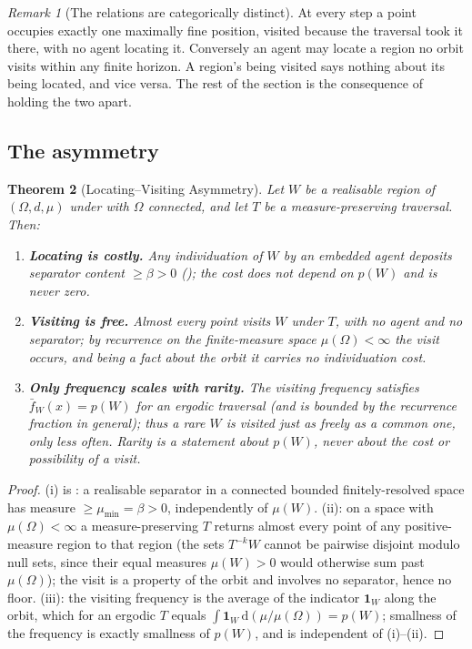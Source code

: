 \documentclass[11pt,a4paper]{article}
\theoremstyle{thmstyle}
\newtheorem{theorem}{Theorem}[section]
\theoremstyle{definition}
\theoremstyle{remark}
\newtheorem{remark}[theorem]{Remark}
\newcommand{\Space}{\Omega}
\newcommand{\thick}{\beta}
\begin{document}
\begin{remark}[The relations are categorically distinct]
\label{rem:two-relations}
At every step a point occupies exactly one maximally fine position, visited
because the traversal took it there, with no agent locating it. Conversely an
agent may locate a region no orbit visits within any finite horizon. A region's
being visited says nothing about its being located, and vice versa. The rest of
the section is the consequence of holding the two apart.
\end{remark}

\subsection{The asymmetry}

\begin{theorem}[Locating--Visiting Asymmetry]
\label{thm:asymmetry}
Let $W$ be a realisable region of $(\Space,d,\mu)$ under  with
$\Space$ connected, and let $T$ be a measure-preserving traversal. Then:
\begin{enumerate}[label=\textup{(\roman*)},leftmargin=2.4em]
\item \textbf{Locating is costly.} Any individuation of $W$ by an embedded agent
deposits separator content $\ge\thick>0$ \textup{(}\textup{)};
the cost does not depend on $p(W)$ and is never zero.
\item \textbf{Visiting is free.} Almost every point visits $W$ under $T$, with no
agent and no separator; by recurrence on the finite-measure space
$\mu(\Space)<\infty$ the visit occurs, and being a fact about the orbit it carries
no individuation cost.
\item \textbf{Only frequency scales with rarity.} The visiting frequency satisfies
$\bar f_W(x)=p(W)$ for an ergodic traversal \textup{(}and is bounded by the
recurrence fraction in general\textup{)}; thus a rare $W$ is visited just as
freely as a common one, only \emph{less often}. Rarity is a statement about
$p(W)$, never about the cost or possibility of a visit.
\end{enumerate}
\end{theorem}

\begin{proof}
(i) is : a realisable separator in a connected bounded
finitely-resolved space has measure $\ge\mu_{\min}=\thick>0$, independently of
$\mu(W)$. (ii): on a space with $\mu(\Space)<\infty$ a measure-preserving $T$
returns almost every point of any positive-measure region to that region (the sets
$T^{-k}W$ cannot be pairwise disjoint modulo null sets, since their equal measures
$\mu(W)>0$ would otherwise sum past $\mu(\Space)$); the visit is a property of the
orbit and involves no separator, hence no floor. (iii): the visiting frequency is
the average of the indicator $\mathbf 1_W$ along the orbit, which for an ergodic
$T$ equals $\int \mathbf 1_W\,\mathrm d(\mu/\mu(\Space))=p(W)$; smallness of the
frequency is exactly smallness of $p(W)$, and is independent of (i)--(ii).
\end{proof}
\end{document}
